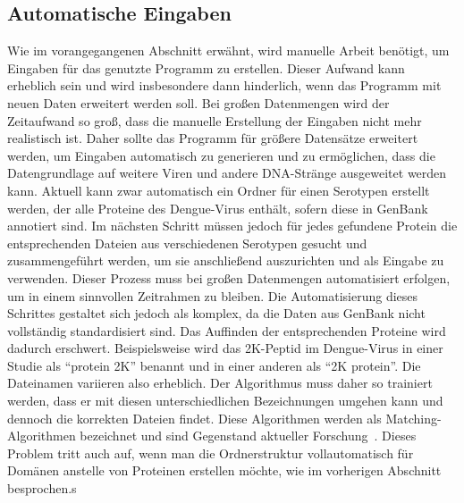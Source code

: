 \documentclass[german,version-2022-01]{uzl-thesis}
\begin{document}
\subsection{Automatische Eingaben}
Wie im vorangegangenen Abschnitt erw\"ahnt, wird manuelle Arbeit ben\"otigt, um Eingaben f\"ur das genutzte Programm zu erstellen. Dieser Aufwand kann erheblich sein und wird insbesondere dann hinderlich, wenn das Programm mit neuen Daten erweitert werden soll. Bei gro\ss{}en Datenmengen wird der Zeitaufwand so gro\ss{}, dass die manuelle Erstellung der Eingaben nicht mehr realistisch ist. Daher sollte das Programm f\"ur gr\"o\ss{}ere Datens\"atze erweitert werden, um Eingaben automatisch zu generieren und zu erm\"oglichen, dass die Datengrundlage auf weitere Viren und andere DNA-Str\"ange ausgeweitet werden kann. Aktuell kann zwar automatisch ein Ordner f\"ur einen Serotypen erstellt werden, der alle Proteine des Dengue-Virus enth\"alt, sofern diese in GenBank annotiert sind. Im n\"achsten Schritt m\"ussen jedoch f\"ur jedes gefundene Protein die entsprechenden Dateien aus verschiedenen Serotypen gesucht und zusammengef\"uhrt werden, um sie anschlie\ss{}end auszurichten und als Eingabe zu verwenden. Dieser Prozess muss bei gro\ss{}en Datenmengen automatisiert erfolgen, um in einem sinnvollen Zeitrahmen zu bleiben. Die Automatisierung dieses Schrittes gestaltet sich jedoch als komplex, da die Daten aus GenBank nicht vollst\"andig standardisiert sind. Das Auffinden der entsprechenden Proteine wird dadurch erschwert. Beispielsweise wird das 2K-Peptid im Dengue-Virus in einer Studie als "`protein 2K"' benannt und in einer anderen als "`2K protein"'. Die Dateinamen variieren also erheblich. Der Algorithmus muss daher so trainiert werden, dass er mit diesen unterschiedlichen Bezeichnungen umgehen kann und dennoch die korrekten Dateien findet. Diese Algorithmen werden als Matching-Algorithmen bezeichnet und sind Gegenstand aktueller Forschung~\cite{jurafsky2020speech, manning2008introduction, zhang2019survey}. Dieses Problem tritt auch auf, wenn man die Ordnerstruktur vollautomatisch f\"ur Dom\"anen anstelle von Proteinen erstellen m\"ochte, wie im vorherigen Abschnitt besprochen.s
\end{document}

